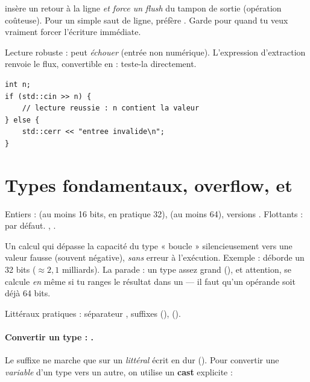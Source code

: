 \documentclass[11pt]{article}
\begin{document}
\begin{piege}
 insère un retour à la ligne \emph{et force un flush} du tampon
de sortie (opération coûteuse). Pour un simple saut de ligne, préfère
. Garde  pour quand tu veux vraiment
forcer l'écriture immédiate.
\end{piege}

Lecture robuste :  peut \emph{échouer} (entrée non
numérique). L'expression d'extraction renvoie le flux, convertible en
 : teste-la directement.

\begin{lstlisting}
int n;
if (std::cin >> n) {
    // lecture reussie : n contient la valeur
} else {
    std::cerr << "entree invalide\n";
}
\end{lstlisting}

\section{Types fondamentaux, overflow,  et }

Entiers :  (au moins 16 bits, en pratique 32),  (au
moins 64), versions . Flottants :  par défaut.
, .

\begin{piege}
Un calcul qui dépasse la capacité du type « boucle » silencieusement vers une
valeur fausse (souvent négative), \emph{sans} erreur à l'exécution. Exemple :
 déborde un  32 bits ($\approx 2{,}1$
milliards). La parade : un type assez grand (), et attention,
 se calcule \emph{en}  même si tu ranges le résultat
dans un  — il faut qu'un opérande soit déjà 64 bits.
\end{piege}

Littéraux pratiques : séparateur , suffixes 
(),  ().

\paragraph{Convertir un type : .} Le suffixe  ne
marche que sur un \emph{littéral} écrit en dur (). Pour convertir une
\emph{variable} d'un type vers un autre, on utilise un \textbf{cast} explicite :
\end{document}
